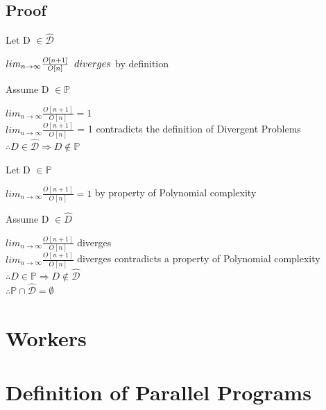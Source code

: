 \documentclass[11pt]{article}
\begin{document}
\subsection{Proof}
Let D $\in \hat{\mathcal{D}}$
\begin{center}
$
lim_{n \rightarrow \infty} \frac{O[n+1]}{O[n]} \hspace{2mm} diverges$ by definition
\end{center}
\vspace{4mm}
Assume D $\in \mathbb{P}$
\begin{center}
$
lim_{n \rightarrow \infty} \frac{O[n+1]}{O[n]} = 1
$
\\ \vspace{2mm}
$
 lim_{n \rightarrow \infty} \frac{O[n+1]}{O[n]}$ = 1 contradicts the definition of Divergent Problems
\\ \vspace{2mm}
$
\therefore D \in \hat{\mathcal{D}} \Rightarrow D \not \in \mathbb{P}
$
\end{center}
\vspace{12mm}
Let D $\in \mathbb{P}$
\begin{center}
$
lim_{n \rightarrow \infty} \frac{O[n+1]}{O[n]} = 1$ by property of Polynomial complexity
\end{center}
\vspace{4mm}
Assume D $\in \hat{D}$
\begin{center}
$
lim_{n \rightarrow \infty} \frac{O[n+1]}{O[n]}$ diverges
\\ \vspace{2mm}
$
 lim_{n \rightarrow \infty} \frac{O[n+1]}{O[n]}$ diverges contradicts a property of Polynomial complexity
\\ \vspace{2mm}
$
\therefore D \in \mathbb{P} \Rightarrow D \not \in \hat{\mathcal{D}}
$
\\ \vspace{2mm}
$
\therefore \mathbb{P} \cap \hat{\mathcal{D}} = \emptyset
$
\end{center}






\newpage
\section{Workers}

\section{Definition of Parallel Programs}
\end{document}
